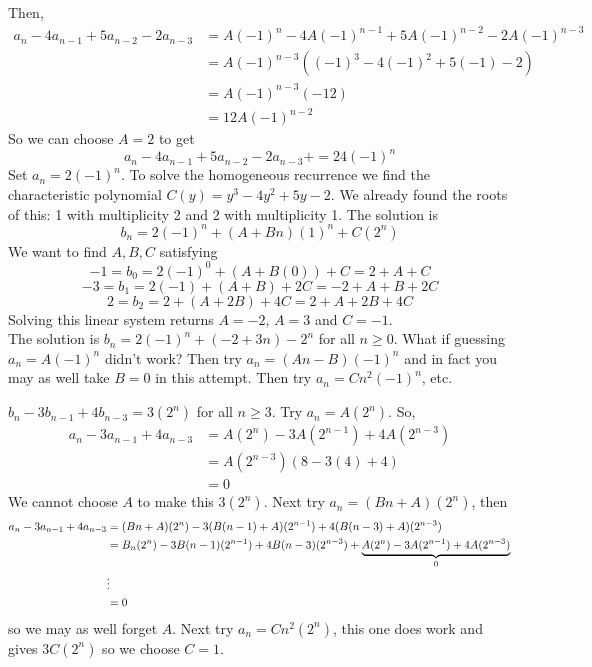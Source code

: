\documentclass[english, 11pt]{article}
\begin{document}
Then, \begin{align*}
  a_n - 4a_{n-1} + 5a_{n-2} - 2a_{n-3} & = A(-1)^n - 4A(-1)^{n-1} + 5A(-1)^{n-2} - 2A(-1)^{n-3} \\
  & = A(-1)^{n-3}((-1)^3 - 4(-1)^2 + 5(-1) -2) \\
  & = A(-1)^{n-3}(-12) \\
  & = 12A(-1)^{n-2}
\end{align*}
So we can choose $A = 2$ to get
\[ a_n - 4a_{n-1} + 5a_{n-2} - 2a_{n-3}+ = 24(-1)^n \]
Set $a_n = 2(-1)^n$. To solve the homogeneous recurrence we find the characteristic polynomial $C(y) = y^3 - 4y^2 + 5y - 2$. We already found the roots of this: 1 with multiplicity 2 and 2 with multiplicity 1. The solution is
\[ b_n = 2(-1)^n + (A+Bn)(1)^n + C(2^n) \]
We want to find $A, B, C$ satisfying
\[ -1 = b_0 = 2(-1)^0 + (A+B(0)) + C = 2 + A + C \]
\[ -3 = b_1 = 2(-1) + (A+ B) + 2C = -2 + A + B + 2C\]
\[  2 = b_2 = 2 + (A + 2B) + 4C = 2 + A + 2B + 4C \]
Solving this linear system returns $A = -2$, $A = 3$ and $C = -1$. \\

The solution is $b_n = 2(-1)^n + (-2 + 3n) -2^n$ for all $n \geq 0$. What if guessing $a_n = A(-1)^n$ didn't work? Then try $a_n = (An -B)(-1)^n$ and in fact you may as well take $B = 0$ in this attempt. Then try $a_n = Cn^2(-1)^n$, etc.

\begin{exmp}
  $b_n - 3b_{n-1} + 4b_{n-3} = 3(2^n)$ for all $n \geq 3$. Try $a_n = A(2^n)$. So,
  \begin{align*}
    a_n - 3a_{n-1} + 4a_{n-3} & = A(2^n) - 3A(2^{n-1}) + 4A(2^{n-3}) \\
    & = A(2^{n-3})(8 - 3(4) + 4) \\
    & = 0
  \end{align*}
  We cannot choose $A$ to make this $3(2^n)$. Next try $a_n = (Bn + A)(2^n)$, then
  \begin{align*}
    a_n - 3a_{n-1} + 4a_{n-3} & = (Bn+A)(2^n) - 3(B(n-1) + A)(2^{n-1}) + 4(B(n-3) + A)(2^{n-3}) \\
    & = B_n(2^n) - 3B(n-1)(2^{n-1}) + 4B(n-3)(2^{n-3}) + \underbrace{A(2^n) - 3A(2^{n-1}) + 4A(2^{n-3})}_0 \\
    & \vdots \\
    & = 0
  \end{align*}
  so we may as well forget $A$. Next try $a_n = Cn^2(2^n)$, this one does work and gives $3C(2^n)$ so we choose $C = 1$.
\end{exmp}
\end{document}

